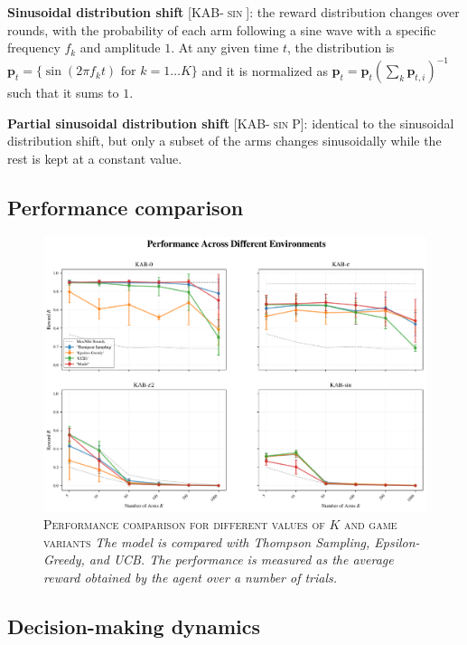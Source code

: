 \noindent \textbf{Sinusoidal distribution shift} [\textsc{KAB-$\sin$}]: the reward distribution changes over rounds, with the probability of each arm following a sine wave with a specific frequency $f_{k}$ and amplitude $1$. At any given time $t$, the distribution is $\mathbf{p}_{t}=\{\sin(2\pi f_{k}
t)\text{  for }k=1\ldots K\}$ and it is
normalized as $\mathbf{p}_{t} = \mathbf{p}_{t}(\sum_{k} \mathbf{p}_{t,i})^{-1}$ such that it sums to $1$.

\noindent \textbf{Partial sinusoidal distribution shift} [\textsc{KAB-$\sin$P}]: identical to the sinusoidal distribution shift, but only a subset of the arms changes sinusoidally while the rest is kept at a constant value.


\subsection{Performance comparison}

\begin{figure}[h]
    \centering
    \includegraphics[width=1.\textwidth]{figures/performance_plot.png}
    \caption{\textsc{Performance comparison for different values of $K$ and game variants} \textit{The model is compared with Thompson Sampling, Epsilon-Greedy, and UCB. The performance is measured as the average reward obtained by the agent over a number of trials.}}
    \label{fig:perf_plot}
\end{figure}


\subsection{Decision-making dynamics}

